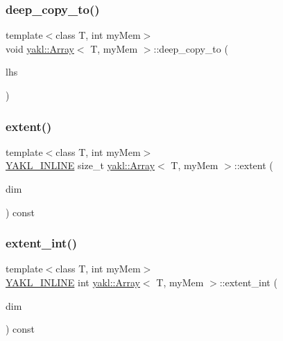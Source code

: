 \subsubsection{\texorpdfstring{deep\+\_\+copy\+\_\+to()}{deep\_copy\_to()}\hspace{0.1cm}{\footnotesize\ttfamily [2/2]}}
{\footnotesize\ttfamily template$<$class T, int my\+Mem$>$ \\
void \hyperlink{classyakl_1_1Array}{yakl\+::\+Array}$<$ T, my\+Mem $>$\+::deep\+\_\+copy\+\_\+to (\begin{DoxyParamCaption}\item[{\hyperlink{classyakl_1_1Array}{Array}$<$ T, \hyperlink{namespaceyakl_ac3c32aec58c61e7f870081477ceee883}{mem\+Device} $>$}]{lhs }\end{DoxyParamCaption})\hspace{0.3cm}{\ttfamily [inline]}}

\mbox{\label{classyakl_1_1Array_a599086e95055086b05b750b9acd605d0}} 
\subsubsection{\texorpdfstring{extent()}{extent()}}
{\footnotesize\ttfamily template$<$class T, int my\+Mem$>$ \\
\hyperlink{YAKL_8h_aa0dd629ffce6d564b19e9313fb91a5ad}{Y\+A\+K\+L\+\_\+\+I\+N\+L\+I\+NE} size\+\_\+t \hyperlink{classyakl_1_1Array}{yakl\+::\+Array}$<$ T, my\+Mem $>$\+::extent (\begin{DoxyParamCaption}\item[{int const}]{dim }\end{DoxyParamCaption}) const\hspace{0.3cm}{\ttfamily [inline]}}

\mbox{\label{classyakl_1_1Array_a5bb64de950330bf36117961177149b42}} 
\subsubsection{\texorpdfstring{extent\+\_\+int()}{extent\_int()}}
{\footnotesize\ttfamily template$<$class T, int my\+Mem$>$ \\
\hyperlink{YAKL_8h_aa0dd629ffce6d564b19e9313fb91a5ad}{Y\+A\+K\+L\+\_\+\+I\+N\+L\+I\+NE} int \hyperlink{classyakl_1_1Array}{yakl\+::\+Array}$<$ T, my\+Mem $>$\+::extent\+\_\+int (\begin{DoxyParamCaption}\item[{int const}]{dim }\end{DoxyParamCaption}) const\hspace{0.3cm}{\ttfamily [inline]}}

